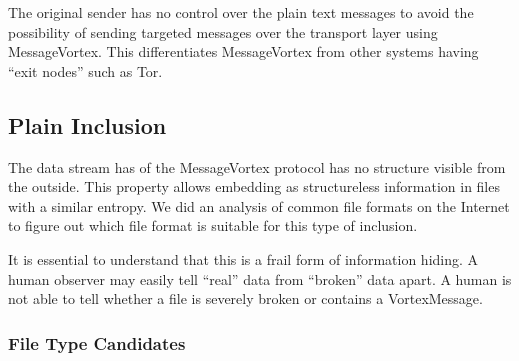The original sender has no control over the plain text messages to avoid the possibility of sending targeted messages over the transport layer using MessageVortex. This differentiates MessageVortex from other systems having ``exit nodes'' such as Tor.

\subsection{Plain Inclusion}
The data stream has of the MessageVortex protocol has no structure visible from the outside. This property allows embedding as structureless information in files with a similar entropy. We did an analysis of common file formats on the Internet to figure out which file format is suitable for this type of inclusion.

It is essential to understand that this is a frail form of information hiding. A human observer may easily tell ``real'' data from ``broken'' data apart. A human is not able to tell whether a file is severely broken or contains a VortexMessage.

\subsubsection{File Type Candidates}

